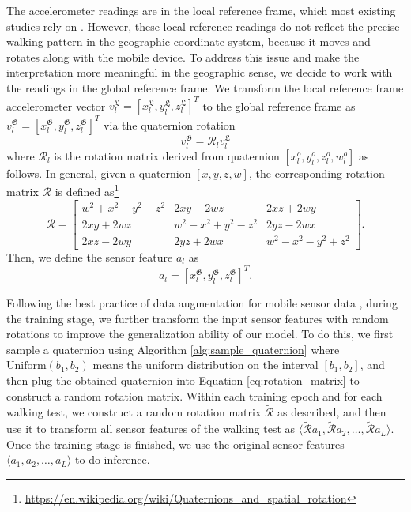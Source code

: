 \documentclass[mnsc]{informs3b} %
\begin{document}
\begin{appendices}
The accelerometer readings are in the local reference frame, which most existing studies rely on . However, these local reference readings do not reflect the precise walking pattern in the geographic coordinate system, because it moves and rotates along with the mobile device. To address this issue and make the interpretation more meaningful in the geographic sense, we decide to work with the readings in the global reference frame. We transform the local reference frame accelerometer vector $v_l^{\mathfrak{L}} =[x_l^{\mathfrak{L}},y_l^{\mathfrak{L}},z_l^{\mathfrak{L}}]^T$ to the global reference frame as $v_l^\mathfrak{G} =[x_l^{\mathfrak{G}},y_l^{\mathfrak{G}},z_l^{\mathfrak{G}}]^T$ via the quaternion rotation 
$$v_l^{\mathfrak{G}} = \mathcal{R}_l v_l^{\mathfrak{L}}$$ 
where $\mathcal{R}_l$ is the rotation matrix derived from quaternion $[x_l^{o},y_l^{o},z_l^{o},w_l^{o}]$ as follows. In general, given a quaternion $[x,y,z,w]$, the corresponding rotation matrix $\mathcal{R}$ is defined as\footnote{\url{https://en.wikipedia.org/wiki/Quaternions_and_spatial_rotation}}
\begin{equation}
\label{eq:rotation_matrix}
   \mathcal{R} = \begin{bmatrix}
       w^2+x^2-y^2-z^2 & 2 x y-2w z & 2 x z+2 w y \\  
        2 x y+2 w z & w^2-x^2+y^2-z^2 & 2 y z-2w x \\
       2 x z-2w y & 2 y z + 2 w x & w^2 - x^2- y^2 + z^2
   \end{bmatrix}.
\end{equation}
Then, we define the sensor feature $a_l$ as
\begin{equation}
a_{l}=[x_l^{\mathfrak{G}},y_l^{\mathfrak{G}},z_l^{\mathfrak{G}} ]^T.
\end{equation}

Following the best practice of data augmentation for mobile sensor data , during the training stage, we further transform the input sensor features with random rotations to improve the generalization ability of our model. To do this, we first sample a quaternion using Algorithm \ref{alg:sample_quaternion} where $\text{Uniform}(b_1,b_2)$ means the uniform distribution on the interval $[b_1,b_2]$, and then plug the obtained quaternion into Equation \ref{eq:rotation_matrix} to construct a random rotation matrix. Within each training epoch and for each walking test, we construct a random rotation matrix $\tilde{\mathcal{R}}$ as described, and then use it to transform all sensor features of the walking test as $\langle \tilde{\mathcal{R}} a_1, \tilde{\mathcal{R}} a_2, \dots, \tilde{\mathcal{R}} a_L \rangle$. Once the training stage is finished, we use the original sensor features $\langle a_1, a_2, \dots, a_L \rangle$ to do inference.


\end{appendices}
\end{document}
